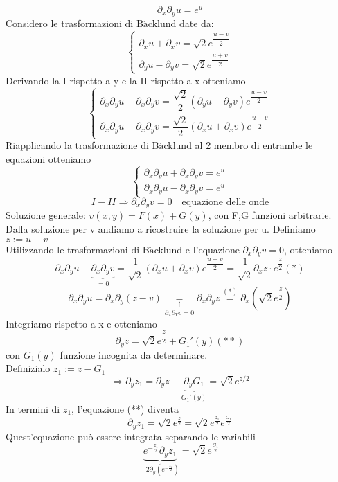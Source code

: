 \documentclass[a4paper,11pt]{report}
\newcommand{\Backlund}{B$\ddot{\text{a}}$cklund }
\begin{document}
$$
\partial_x\partial_y u = e^u
$$
Considero le trasformazioni di \Backlund  date da:
$$
\left\{\begin{matrix}
\partial_x u + \partial_x v = \sqrt{2}e^{\dfrac{u-v}{2}} \\
\partial_y u - \partial_y v = \sqrt{2}e^{\dfrac{u+v}{2}}
\end{matrix}\right.
$$
Derivando la I rispetto a y e la II rispetto a x otteniamo
$$
\left\{\begin{matrix}
\partial_x\partial_y u + \partial_x \partial_y v = \dfrac{\sqrt{2}}{2}\left(\partial_y u - \partial_y v \right)e^{\dfrac{u-v}{2}} \\
\partial_x\partial_y u - \partial_x \partial_y v = \dfrac{\sqrt{2}}{2}\left(\partial_x u + \partial_x v \right)e^{\dfrac{u+v}{2}}
\end{matrix}\right.
$$
Riapplicando la trasformazione di \Backlund al 2 membro di entrambe le equazioni otteniamo
$$
\left\{\begin{matrix}
\partial_x\partial_y u + \partial_x \partial_y v = e^u \\
\partial_x\partial_y u - \partial_x \partial_y v = e^u
\end{matrix}\right.
$$
$$
I - II \Rightarrow\partial_x\partial_y v=0\quad \text{equazione delle onde}
$$
Soluzione generale: $v(x,y)=F(x)+G(y)$, con F,G funzioni arbitrarie.\\
Dalla soluzione per v andiamo a ricostruire la soluzione per u. Definiamo $z:=u+v$\\
Utilizzando le trasformazioni di \Backlund e l'equazione $\partial_x \partial_y v=0$, otteniamo
$$
\partial_x\partial_y u -\underset{=0}{\underbrace{\partial_x \partial_y v}} = \dfrac{1}{\sqrt{2}}\left(\partial_x u + \partial_x v\right)e^{\dfrac{u+v}{2}}=\dfrac{1}{\sqrt{2}}\partial_x z \cdot e^{\dfrac{z}{2}} (*)
$$
$$
\partial_x\partial_y u = \partial_x \partial_y (z-v)\underset{\partial_x \partial_Y v=0}{\underset{\uparrow}{=}}\partial_x \partial_y z \overset{(*)}{=}\partial_x \left(\sqrt{2}e^{\dfrac{z}{2}}\right)
$$
Integriamo rispetto a x e otteniamo
$$
\partial_y z = \sqrt{2}e^{\dfrac{z}{2}}+ G_1'(y) (**)
$$
con $G_1(y)$ funzione incognita da determinare.\\
Definizialo $z_1:=z-G_1$
$$
\Rightarrow \partial_y z_1 = \partial_y z- \underset{G_1'(y)}{\underbrace{\partial_y G_1}}=\sqrt{2}e^{z/2}
$$
In termini di $z_1$, l'equazione (**) diventa
$$
\partial_y z_1=\sqrt{2}e^{\frac{z}{2}}=\sqrt{2}e^{\frac{z_1}{2}}e^{\frac{G_1}{2}}
$$
Quest'equazione può essere integrata separando le variabili
$$
\underset{-2\partial_y\left(e^{-\frac{z_1}{2}} \right)}{\underbrace{e^{-\frac{z_1}{2}}\partial_y z_1}}=\sqrt{2}e^{\frac{G_1}{2}}
$$
\end{document}
